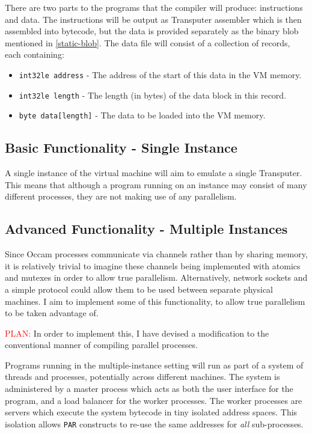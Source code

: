 There are two parts to the programs that the compiler will produce:
instructions and data. The instructions will be output as Transputer assembler
which is then assembled into bytecode, but the data is provided separately as
the binary blob mentioned in \ref{static-blob}. The data file will consist of a
collection of records, each containing:
\begin{itemize}
  \item
    \texttt{int32le address} - The address of the start of this data in the VM
    memory.
  \item
    \texttt{int32le length} - The length (in bytes) of the data block in this
    record.
  \item
    \texttt{byte data[length]} - The data to be loaded into the VM memory.
\end{itemize}

\subsection{Basic Functionality - Single Instance}

A single instance of the virtual machine will aim to emulate a single
Transputer. This means that although a program running on an instance may
consist of many different processes, they are not making use of any parallelism.

\subsection{Advanced Functionality - Multiple Instances}

Since Occam processes communicate via channels rather than by sharing memory, it
is relatively trivial to imagine these channels being implemented with atomics
and mutexes in order to allow true parallelism. Alternatively, network sockets
and a simple protocol could allow them to be used between separate physical
machines. I aim to implement some of this functionality, to allow true
parallelism to be taken advantage of.

\textcolor{red}{PLAN:} In order to implement this, I have devised a modification
to the conventional manner of compiling parallel processes.

Programs running in the multiple-instance setting will run as part of a system
of threads and processes, potentially across different machines. The system is
administered by a master process which acts as both the user interface for the
program, and a load balancer for the worker processes. The worker processes are
servers which execute the system bytecode in tiny isolated address spaces. This
isolation allows \texttt{PAR} constructs to re-use the same addresses for
\textit{all} sub-processes.
